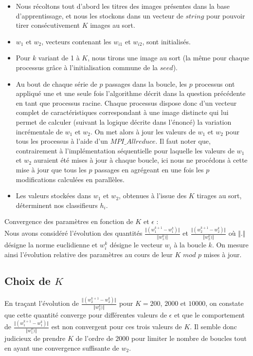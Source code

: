 \documentclass[a4paper,11pt]{article}
\begin{document}
\begin{itemize}
	\item Nous récoltons tout d’abord les titres des images présentes dans la base d’apprentissage, et nous les stockons dans un vecteur de $string$ pour pouvoir tirer consécutivement $K$ images au sort. \\
	\item  $w_1$ et $w_2$, vecteurs contenant les $w_{i1}$ et $w_{i2}$, sont initialisés.\\
	\item  Pour $k$ variant de 1 à $K$, nous tirons une image au sort (la même pour chaque processus grâce à l’initialisation commune de la $seed$).\\
	\item  Au bout de chaque série de $p$ passages dans la boucle, les $p$ processus ont appliqué une et une seule fois l’algorithme décrit dans la question précédente en tant que processus racine. Chaque processus dispose donc d’un vecteur complet de caractéristiques correspondant à une image distincte qui lui permet de calculer (suivant la logique décrite dans l’énoncé) la variation incrémentale de $w_1$ et $w_2$. On met alors à jour les valeurs de $w_1$ et $w_2$ pour tous les processus à l’aide d’un $MPI\_Allreduce$. Il faut noter que, contrairement à l'implémentation séquentielle pour laquelle les valeurs de $w_1$ et $w_2$ auraient été mises à jour à chaque boucle, ici nous ne procédons à cette mise à jour que tous les $p$ passages en agrégeant en une fois les $p$ modifications calculées en parallèles. \\
	\item  Les valeurs stockées dans $w_1$ et $w_2$, obtenues à l’issue des $K$ tirages au sort, déterminent nos classifieurs $h_i$.\\
		
\end{itemize}

Convergence des paramètres en fonction de $K$ et $\epsilon$ :\\
Nous avons considéré l'évolution des quantités $  \frac{\Vert(w_1^{k+1} - w_1^{k})\Vert}{\Vert w_1^{k})\Vert}$ et $  \frac{\Vert(w_2^{k+1} - w_2^{k})\Vert}{\Vert w_2^{k})\Vert}$ où $\Vert . \Vert$ désigne la norme euclidienne et $w_i^k$ désigne le vecteur $w_i$ à la boucle $k$. On mesure ainsi l'évolution relative des paramètres au cours de leur $K$ $mod$ $p$ mises à jour. 

\subsection{Choix de $K$}
En traçant l'évolution de $  \frac{\Vert(w_2^{k+1} - w_2^{k})\Vert}{\Vert w_2^{k})\Vert}$ pour $K = 200$, $2000$ et $10000$, on constate que cette quantité converge pour différentes valeurs de $\epsilon$ et que le comportement de $  \frac{\Vert(w_1^{k+1} - w_1^{k})\Vert}{\Vert w_1^{k})\Vert}$ est non convergent pour ces trois valeurs de $K$. Il semble donc judicieux de prendre $K$ de l'ordre de $2000$ pour limiter le nombre de boucles tout en ayant une convergence suffisante de $w_2$. \\
\end{document}
